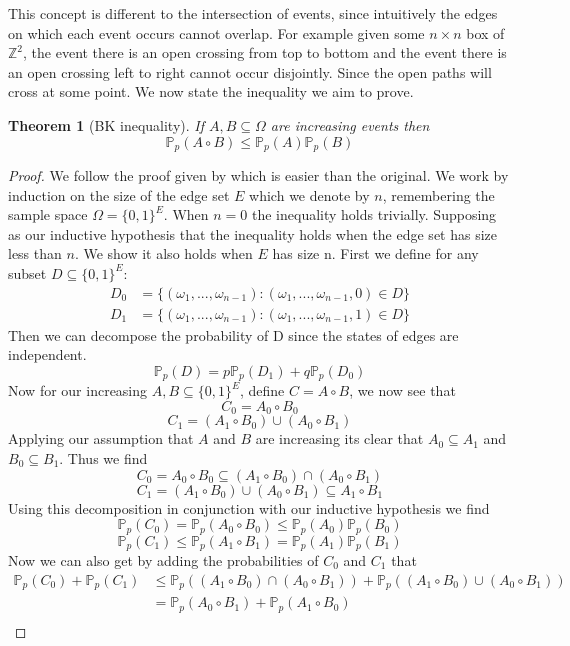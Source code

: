 \documentclass[a4paper,11pt]{article}
\newtheorem{theorem}{Theorem}[section]
\theoremstyle{definition}
\newcommand{\ints}{\mathbb{Z}}
\newcommand{\prob}{\mathbb{P}_p}
\begin{document}
This concept is different to the intersection of events, since intuitively the edges on which each event occurs cannot overlap.
For example given some $n\times n$ box of $\ints^2$, the event there is an open crossing from top to bottom and the event there is an open crossing left to right cannot occur disjointly. Since the open paths will cross at some point.
We now state the inequality we aim to prove.
\begin{theorem}[BK inequality]
	If $A, B \subseteq \Omega$ are increasing events then
	$$\prob(A \circ B) \leq \prob(A)\prob(B)$$
\end{theorem}
\begin{proof}
	We follow the proof given by \cite{bollo2006} which is easier than the original.
	We work by induction on the size of the edge set $E$ which we denote by $n$, remembering the sample space $\Omega = \{0,1\}^E$.
	When $n = 0$ the inequality holds trivially.
	Supposing as our inductive hypothesis that the inequality holds when the edge set has size less than $n$.
	We show it also holds when $E$ has size n.
	First we define for any subset $D \subseteq \{0,1\}^E$:
	\begin{align*}
		D_0 &= \{(\omega_1,...,\omega_{n-1}) : (\omega_1,...,\omega_{n-1}, 0 ) \in D\}\\
		D_1 &= \{(\omega_1,...,\omega_{n-1}) : (\omega_1,...,\omega_{n-1}, 1 ) \in D\}
	\end{align*}
	Then we can decompose the probability of D since the states of edges are independent.
	$$\prob(D) = p\prob(D_1) + q\prob(D_0)$$
	Now for our increasing $A,B \subseteq \{0,1\}^E$, define $C = A \circ B$, we now see that 
	$$C_0 = A_0 \circ B_0$$
	$$C_1 = (A_1 \circ B_0) \cup (A_0 \circ B_1)$$
	Applying our assumption that $A$ and $B$ are increasing its clear that $A_0 \subseteq A_1$ and $B_0 \subseteq B_1$.
	Thus we find
	$$C_0 = A_0 \circ B_0 \subseteq (A_1 \circ B_0) \cap (A_0 \circ B_1)$$
	$$C_1 = (A_1 \circ B_0) \cup (A_0 \circ B_1) \subseteq A_1 \circ B_1$$
	Using this decomposition in conjunction with our inductive hypothesis we find 
	$$\prob(C_0) = \prob(A_0 \circ B_0) \leq \prob(A_0)\prob(B_0)$$
	$$\prob(C_1) \leq \prob(A_1 \circ B_1) = \prob(A_1)\prob(B_1)$$
	Now we can also get by adding the probabilities of $C_0$ and $C_1$ that 
	\begin{align*}
		\prob(C_0) + \prob(C_1) &\leq \prob((A_1 \circ B_0) \cap (A_0 \circ B_1)) + \prob((A_1 \circ B_0) \cup (A_0 \circ B_1))\\
								&= \prob(A_0 \circ B_1) + \prob(A_1 \circ B_0)\\

\end{align*}
\end{proof}
\end{document}
